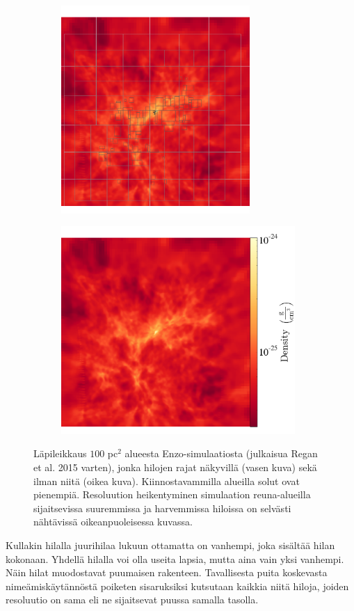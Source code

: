 \documentclass[12pt,a4paper]{article}
\begin{document}
\begin{figure}
   \centering
   \begin{subfigure}[b]{0.45\textwidth}
       \includegraphics[height=7.9cm]{../kuvat/amr-grid.png}
   \end{subfigure}
   \begin{subfigure}[b]{0.45\textwidth}
       \includegraphics[height=7.9cm]{../kuvat/amr-nogrid.png}
   \end{subfigure}
   \caption{Läpileikkaus $100$ pc$^2$ alueesta Enzo-simulaatiosta (julkaisua Regan et al. 2015 varten), jonka hilojen rajat näkyvillä (vasen kuva) sekä ilman niitä (oikea kuva). Kiinnostavammilla alueilla solut ovat pienempiä. Resoluution heikentyminen simulaation reuna-alueilla sijaitsevissa suuremmissa ja harvemmissa hiloissa on selvästi nähtävissä oikeanpuoleisessa kuvassa.}\label{fig:enzogrid} %
\end{figure}
	
Kullakin hilalla juurihilaa lukuun ottamatta on vanhempi, joka sisältää hilan kokonaan. Yhdellä hilalla voi olla useita lapsia, mutta aina vain yksi vanhempi. Näin hilat muodostavat puumaisen rakenteen. Tavallisesta puita koskevasta nimeämiskäytännöstä poiketen sisaruksiksi kutsutaan kaikkia niitä hiloja, joiden resoluutio on sama eli ne sijaitsevat puussa samalla tasolla. \cite{enzo}
	
\end{document}
